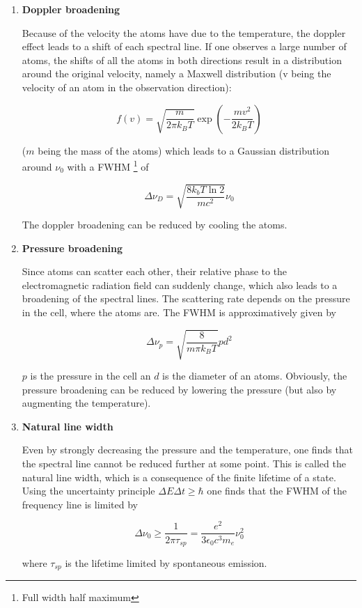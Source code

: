 \begin{enumerate}
\item \textbf{Doppler broadening}

	Because of the velocity the atoms have due to the temperature, the doppler effect leads to a shift of each 	spectral line. If one observes a large number of atoms, the shifts of all the atoms in both directions result in a 	distribution around the original velocity, namely a Maxwell distribution (v being the velocity of an atom in the 	observation direction):
	
	$$ f(v) = \sqrt{\frac{m}{2\pi k_B T}}\exp\left(-\frac{mv^2}{2k_BT}\right) $$
	
	($m$ being the mass of the atoms) which leads to a Gaussian distribution around $\nu_0$ with a FWHM	\footnote{Full width half maximum} of
	
	$$ \Delta \nu_D = \sqrt{\frac{8k_bT\ln2}{mc^2}}\nu_0 $$

	The doppler broadening can be reduced by cooling the atoms.
	
\item \textbf{Pressure broadening}

	Since atoms can scatter each other, their relative phase to the electromagnetic radiation field can suddenly 	change, which also leads to a broadening of the spectral lines. The scattering rate	depends on the 		pressure in the cell, where the atoms are. The FWHM is approximatively given by
	
	$$ \Delta\nu_p = \sqrt{\frac{8}{m\pi k_BT}}pd^2 $$

	$p$ is the pressure in the cell an $d$ is the diameter of an atoms. Obviously, the pressure broadening can 	be reduced by lowering the pressure (but also by augmenting the temperature).
	
\item \textbf{Natural line width}

	Even by strongly decreasing the pressure and the temperature, one finds that the spectral line cannot be 	reduced further at some point. This is called the natural line width, which is a consequence of the finite 		lifetime of a state. Using the uncertainty principle $\Delta E\Delta t \geq \hbar$ one finds that the FWHM of 	the frequency line is limited by
	
	$$ \Delta \nu_0 \geq \frac{1}{2\pi\tau_{sp}} = \frac{e^2}{3\epsilon_0c^3m_e}\nu_0^2 $$
	
	where $\tau_{sp}$ is the lifetime limited by spontaneous emission.

\end{enumerate}

